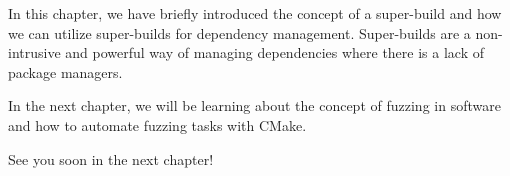In this chapter, we have briefly introduced the concept of a super-build and how we can utilize super-builds for dependency management. Super-builds are a non-intrusive and powerful way of managing dependencies where there is a lack of package managers.

In the next chapter, we will be learning about the concept of fuzzing in software and how to automate fuzzing tasks with CMake.

See you soon in the next chapter!